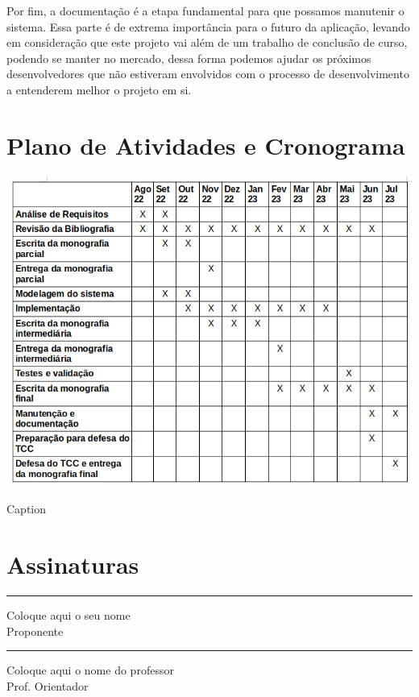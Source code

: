 \documentclass[tcc-proposta]{texufpel}
\begin{document}
Por fim, a documentação é a etapa fundamental para que possamos manutenir o sistema. Essa parte é de extrema importância para o futuro da aplicação, levando em consideração que este projeto vai além de um trabalho de conclusão de curso, podendo se manter no mercado, dessa forma podemos ajudar os próximos desenvolvedores que não estiveram envolvidos com o processo de desenvolvimento a entenderem melhor o projeto em si.

\chapter{Plano de Atividades e Cronograma}

\begin{image}
    \centering
    \includegraphics[scale=0.65]{cronograma1.png}
    \caption{Caption}
    \label{fig:my_label}
\end{image}





\chapter{Assinaturas}
\vspace{2cm}

\begin{center}
\rule{8cm}{.3mm}
\medskip

	Coloque aqui o seu nome\\
	Proponente

\end{center}

\vspace{4cm}

\begin{center}
\rule{8cm}{.3mm}
\medskip

	Coloque aqui o nome do professor\\
	Prof. Orientador

\end{center}
\end{document}
